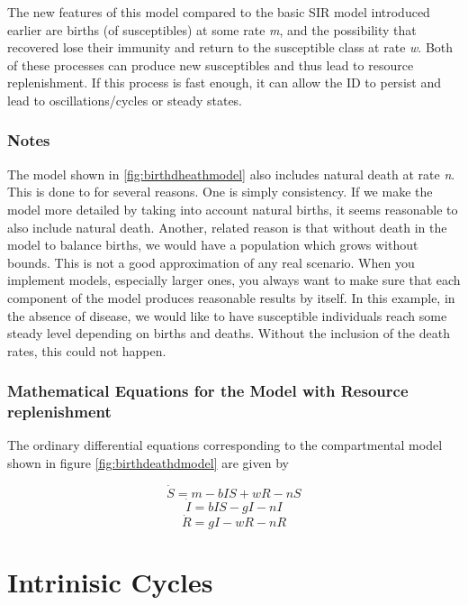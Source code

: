 \documentclass[]{book}
\theoremstyle{definition}
\theoremstyle{definition}
\theoremstyle{definition}
\theoremstyle{remark}
\begin{document}
The new features of this model compared to the basic SIR model
introduced earlier are births (of susceptibles) at some rate \emph{m},
and the possibility that recovered lose their immunity and return to the
susceptible class at rate \emph{w}. Both of these processes can produce
new susceptibles and thus lead to resource replenishment. If this
process is fast enough, it can allow the ID to persist and lead to
oscillations/cycles or steady states.

\subsubsection{Notes}\label{mynotebox}

The model shown in \ref{fig:birthdheathmodel} also includes natural
death at rate \emph{n}. This is done to for several reasons. One is
simply consistency. If we make the model more detailed by taking into
account natural births, it seems reasonable to also include natural
death. Another, related reason is that without death in the model to
balance births, we would have a population which grows without bounds.
This is not a good approximation of any real scenario. When you
implement models, especially larger ones, you always want to make sure
that each component of the model produces reasonable results by itself.
In this example, in the absence of disease, we would like to have
susceptible individuals reach some steady level depending on births and
deaths. Without the inclusion of the death rates, this could not happen.

\subsubsection{Mathematical Equations for the Model with Resource
replenishment}\label{myadvancedbox}

The ordinary differential equations corresponding to the compartmental
model shown in figure \ref{fig:birthdeathdmodel} are given by

\[\dot S = m - b I S + wR - n S \] \[\dot I = b IS - gI - n I \]
\[\dot R =  gI - wR - n R\]

\section{Intrinisic Cycles}\label{intrinisic-cycles}
\end{document}

